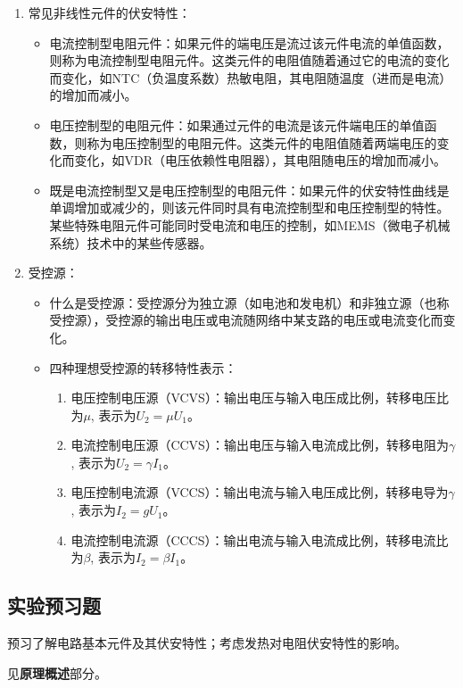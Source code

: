 \documentclass[dvipsnames, svgnames,a4paper,11pt]{article}
\begin{document}
\begin{enumerate}
		\item 常见非线性元件的伏安特性：
		\begin{itemize}
			\item 电流控制型电阻元件：如果元件的端电压是流过该元件电流的单值函数，则称为电流控制型电阻元件。这类元件的电阻值随着通过它的电流的变化而变化，如NTC（负温度系数）热敏电阻，其电阻随温度（进而是电流）的增加而减小。
			\item 电压控制型的电阻元件：如果通过元件的电流是该元件端电压的单值函数，则称为电压控制型的电阻元件。这类元件的电阻值随着两端电压的变化而变化，如VDR（电压依赖性电阻器），其电阻随电压的增加而减小。
			\item 既是电流控制型又是电压控制型的电阻元件：如果元件的伏安特性曲线是单调增加或减少的，则该元件同时具有电流控制型和电压控制型的特性。某些特殊电阻元件可能同时受电流和电压的控制，如MEMS（微电子机械系统）技术中的某些传感器。
		\end{itemize}
		
		\item 受控源：
		\begin{itemize}
			\item 什么是受控源：受控源分为独立源（如电池和发电机）和非独立源（也称受控源），受控源的输出电压或电流随网络中某支路的电压或电流变化而变化。
			\item 四种理想受控源的转移特性表示：
			\begin{enumerate}
				\item 电压控制电压源（VCVS）：输出电压与输入电压成比例，转移电压比为\(\mu\), 表示为$U_2 = \mu U_1$。
				\item 电流控制电压源（CCVS）：输出电压与输入电流成比例，转移电阻为\(\gamma\), 表示为$U_2 = \gamma I_1$。
				\item 电压控制电流源（VCCS）：输出电流与输入电压成比例，转移电导为\(\gamma\), 表示为$I_2 = gU_1$。
				\item 电流控制电流源（CCCS）：输出电流与输入电流成比例，转移电流比为\(\beta\), 表示为$I_2 = \beta I_1$。
			\end{enumerate}
		\end{itemize}
	\end{enumerate}
	
	
	
	\subsection{实验预习题}
	
	\begin{question}
		预习了解电路基本元件及其伏安特性；考虑发热对电阻伏安特性的影响。
	\end{question}
	见\textbf{原理概述}部分。
	
\end{document}
